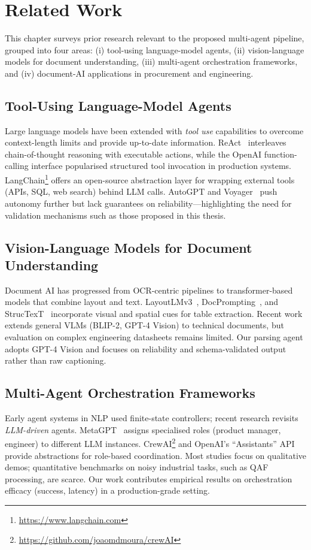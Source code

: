 \chapter{Related Work}\label{chapter:relatedwork}


This chapter surveys prior research relevant to the proposed multi-agent pipeline, grouped into four areas: (i) tool-using language-model agents, (ii) vision-language models for document understanding, (iii) multi-agent orchestration frameworks, and (iv) document-AI applications in procurement and engineering.

\section{Tool-Using Language-Model Agents}
Large language models have been extended with \emph{tool use} capabilities to overcome context-length limits and provide up-to-date information.  
ReAct~\cite{yao2023react} interleaves chain-of-thought reasoning with executable actions, while the OpenAI function-calling interface popularised structured tool invocation in production systems.  
LangChain\footnote{\url{https://www.langchain.com}} offers an open-source abstraction layer for wrapping external tools (APIs, SQL, web search) behind LLM calls.  
AutoGPT and Voyager~\cite{wang2023voyager} push autonomy further but lack guarantees on reliability—highlighting the need for validation mechanisms such as those proposed in this thesis.

\section{Vision-Language Models for Document Understanding}
Document AI has progressed from OCR-centric pipelines to transformer-based models that combine layout and text.  
LayoutLMv3~\cite{xuhuang2022layoutlmv3}, DocPrompting~\cite{li2023docprompt}, and StrucTexT~\cite{li2021structext} incorporate visual and spatial cues for table extraction.  
Recent work extends general VLMs (BLIP-2, GPT-4 Vision) to technical documents, but evaluation on complex engineering datasheets remains limited.  
Our parsing agent adopts GPT-4 Vision and focuses on reliability and schema-validated output rather than raw captioning.

\section{Multi-Agent Orchestration Frameworks}
Early agent systems in NLP used finite-state controllers; recent research revisits \emph{LLM-driven} agents.  
MetaGPT~\cite{hong2023metagpt} assigns specialised roles (product manager, engineer) to different LLM instances.  
CrewAI\footnote{\url{https://github.com/joaomdmoura/crewAI}} and OpenAI’s “Assistants” API provide abstractions for role-based coordination.  
Most studies focus on qualitative demos; quantitative benchmarks on noisy industrial tasks, such as QAF processing, are scarce.  
Our work contributes empirical results on orchestration efficacy (success, latency) in a production-grade setting.

